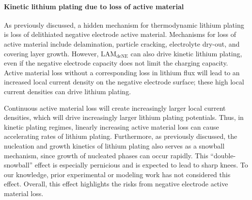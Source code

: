 \documentclass[journal=jpclcd,manuscript=article]{achemso}
\begin{document}
\paragraph{Kinetic lithium plating due to loss of active material}
As previously discussed, a hidden mechanism for thermodynamic lithium plating is loss of delithiated negative electrode active material.\cite{ansean_operando_2017, dubarry_durability_2018, baure_synthetic_2019, dubarry_big_2020} Mechanisms for loss of active material include delamination, particle cracking, electrolyte dry-out, and covering layer growth. However, $\mathrm{LAM_{deNE}}$ can also drive kinetic lithium plating, even if the negative electrode capacity does not limit the charging capacity. Active material loss without a corresponding loss in lithium flux will lead to an increased local current density on the negative electrode surface; these high local current densities can drive lithium plating.

Continuous active material loss will create increasingly larger local current densities, which will drive increasingly larger lithium plating potentials. Thus, in kinetic plating regimes, linearly increasing active material loss can cause accelerating rates of lithium plating. Furthermore, as previously discussed, the nucleation and growth kinetics of lithium plating also serves as a snowball mechanism, since growth of nucleated phases can occur rapidly. This ``double-snowball'' effect is especially pernicious and is expected to lead to sharp knees. To our knowledge, prior experimental or modeling work has not considered this effect. Overall, this effect highlights the risks from negative electrode active material loss.
\end{document}
